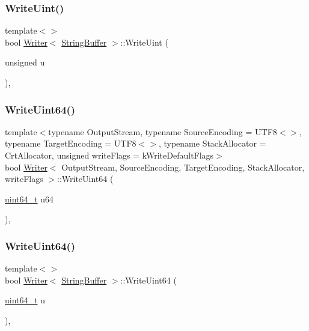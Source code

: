 \subsubsection{\texorpdfstring{Write\+Uint()}{WriteUint()}\hspace{0.1cm}{\footnotesize\ttfamily [2/2]}}
{\footnotesize\ttfamily template$<$$>$ \\
bool \hyperlink{classWriter}{Writer}$<$ \hyperlink{fwd_8h_ab956b6537825abf8aac4112e81cfad7e}{String\+Buffer} $>$\+::Write\+Uint (\begin{DoxyParamCaption}\item[{unsigned}]{u }\end{DoxyParamCaption})\hspace{0.3cm}{\ttfamily [inline]}, {\ttfamily [protected]}}

\mbox{\label{classWriter_ad07b325157220e3aa791c1c8c904021e}} 
\subsubsection{\texorpdfstring{Write\+Uint64()}{WriteUint64()}\hspace{0.1cm}{\footnotesize\ttfamily [1/2]}}
{\footnotesize\ttfamily template$<$typename Output\+Stream, typename Source\+Encoding = U\+T\+F8$<$$>$, typename Target\+Encoding = U\+T\+F8$<$$>$, typename Stack\+Allocator = Crt\+Allocator, unsigned write\+Flags = k\+Write\+Default\+Flags$>$ \\
bool \hyperlink{classWriter}{Writer}$<$ Output\+Stream, Source\+Encoding, Target\+Encoding, Stack\+Allocator, write\+Flags $>$\+::Write\+Uint64 (\begin{DoxyParamCaption}\item[{\hyperlink{stdint_8h_aec6fcb673ff035718c238c8c9d544c47}{uint64\+\_\+t}}]{u64 }\end{DoxyParamCaption})\hspace{0.3cm}{\ttfamily [inline]}, {\ttfamily [protected]}}

\mbox{\label{classWriter_a025b3d2ca07d539a7067575e95f5578d}} 
\subsubsection{\texorpdfstring{Write\+Uint64()}{WriteUint64()}\hspace{0.1cm}{\footnotesize\ttfamily [2/2]}}
{\footnotesize\ttfamily template$<$$>$ \\
bool \hyperlink{classWriter}{Writer}$<$ \hyperlink{fwd_8h_ab956b6537825abf8aac4112e81cfad7e}{String\+Buffer} $>$\+::Write\+Uint64 (\begin{DoxyParamCaption}\item[{\hyperlink{stdint_8h_aec6fcb673ff035718c238c8c9d544c47}{uint64\+\_\+t}}]{u }\end{DoxyParamCaption})\hspace{0.3cm}{\ttfamily [inline]}, {\ttfamily [protected]}}



